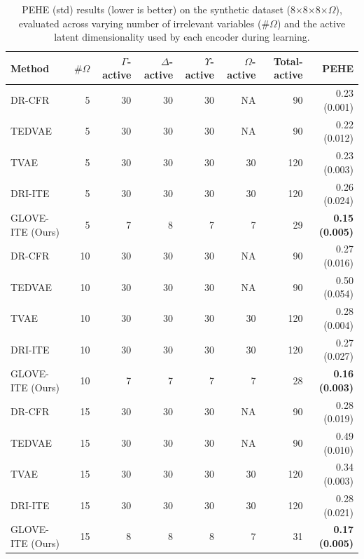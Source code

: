 \documentclass[doubleblind]{ecai}
\begin{document}
	\begin{table} [!ht]
		\centering
		\caption{PEHE (std) results (lower is better) on the synthetic dataset (8×8×8×$\Omega$), evaluated across varying number of irrelevant variables ($\#\Omega$) and the active latent dimensionality used by each encoder during learning.}
		\begin{tabular}{lrrrrrrr}
			\toprule
			Method & $\#\Omega$  & $\Gamma$-active & $\Delta$-active & $\Upsilon$-active & $\Omega$-active & Total-active & PEHE  \\
			\midrule
			DR-CFR		&5				& 30 & 30      & 30           & NA   & 90      		&0.23 (0.001)	\\
			TEDVAE    	& 5          	& 30 & 30      & 30           & NA   & 90          	& 0.22 (0.012)           \\
			TVAE   		& 5      		& 30 & 30      & 30           & 30   & 120          & 0.23 (0.003)        \\
			DRI-ITE     & 5       		& 30 & 30      & 30           & 30   & 120          & 0.26 (0.024)           \\
			GLOVE-ITE (Ours)   	& 5          	& 7 & 8      & 7           & 7   & 29      & \textbf{0.15 (0.005)}          \\
			
			\bottomrule
			DR-CFR		&10	& 30 & 30      & 30           & NA   & 90      & 0.27 (0.016)		\\
			TEDVAE    	& 10         	& 30 & 30      & 30           & NA   & 90          & 0.50 (0.054)           \\
			TVAE   		& 10       		& 30 & 30      & 30           & 30   & 120          & 0.28 (0.004)        \\
			DRI-ITE     & 10      		& 30 & 30      & 30           & 30   & 120          & 0.27 (0.027)           \\
			GLOVE-ITE (Ours)    	& 10           	& 7 & 7      & 7           &7   & 28          & \textbf{0.16 (0.003)}          \\
			
			\bottomrule
			DR-CFR		&15	& 30 & 30      & 30           & NA   & 90      &0.28 (0.019)	\\
			TEDVAE    	& 15        	& 30 & 30      & 30           & NA   & 90          & 0.49 (0.010)           \\
			TVAE   		& 15      		& 30 & 30      & 30           & 30   & 120          & 0.34 (0.003)        \\
			DRI-ITE     & 15       		& 30 & 30      & 30           & 30   & 120          & 0.28 (0.021)           \\
			GLOVE-ITE (Ours)    	& 15           	& 8 & 8      & 8           & 7   & 31          & \textbf{0.17 (0.005)}          \\
			

\end{tabular}
\end{table}
\end{document}
